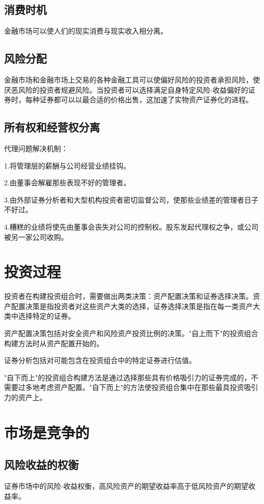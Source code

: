 \documentclass{article}
\begin{document}
\subsection{消费时机}
金融市场可以使人们的现实消费与现实收入相分离。

\subsection{风险分配}
金融市场和金融市场上交易的各种金融工具可以使偏好风险的投资者承担风险，使厌恶风险的投资者规避风险。当投资者可以选择满足自身特定风险-收益偏好的证券时，每种证券都可以以最合适的价格出售，这加速了实物资产证券化的进程。

\subsection{所有权和经营权分离}
代理问题解决机制：

1.将管理层的薪酬与公司经营业绩挂钩。

2.由董事会解雇那些表现不好的管理者。

3.由外部证券分析者和大型机构投资者密切监督公司，使那些业绩差的管理者日子不好过。

4.糟糕的业绩将使先由董事会丧失对公司的控制权。股东发起代理权之争，或公司被另一家公司收购。

\section{投资过程}
投资者在构建投资组合时，需要做出两类决策：资产配置决策和证券选择决策。资产配置决策是指投资者对这些资产大类的选择，证券选择决策是指在每一类资产大类中选择特定的证券。

资产配置决策包括对安全资产和风险资产投资比例的决策。"自上而下"的投资组合构建方法时从资产配置开始的。

证券分析包括对可能包含在投资组合中的特定证券进行估值。

"自下而上"的投资组合构建方法是通过选择那些具有价格吸引力的证券完成的，不需要过多地考虑资产配置。"自下而上"的方法使投资组合集中在那些最具投资吸引力的资产上。

\section{市场是竞争的}
\subsection{风险收益的权衡}
证券市场中的风险-收益权衡，高风险资产的期望收益率高于低风险资产的期望收益率。
\end{document}
